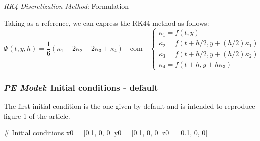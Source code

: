 
\begin{frame}{\textit{RK4 Discretization Method}: Formulation}
	
	Taking \cite{roma2023} as a reference, we can express the RK44 method as follows:
	\begin{equation*}
		\Phi(t,y,h) = \frac{1}{6} \left( \kappa_1 + 2\kappa_2 + 2\kappa_3 + \kappa_4 \right) \quad \text{com} \quad
		\begin{cases}
			\kappa_1 = f(t,y)                                       \\
			\kappa_2 = f \left( t + h/2, y + (h/2) \kappa_1 \right) \\
			\kappa_3 = f \left( t + h/2, y + (h/2) \kappa_2 \right) \\
			\kappa_4 = f \left( t + h, y + h\kappa_3 \right)        
		\end{cases}
	\end{equation*}
\end{frame}

\begin{frame}[fragile]
		
	\frametitle{\textit{PE Model}: Initial conditions - default}
	The first initial condition is the one given by default and is intended to reproduce figure 1 of the article.   
	\begin{python}
# Initial conditions
x0 = [0.1, 0, 0]
y0 = [0.1, 0, 0]
z0 = [0.1, 0, 0]
	\end{python}
\end{frame}



